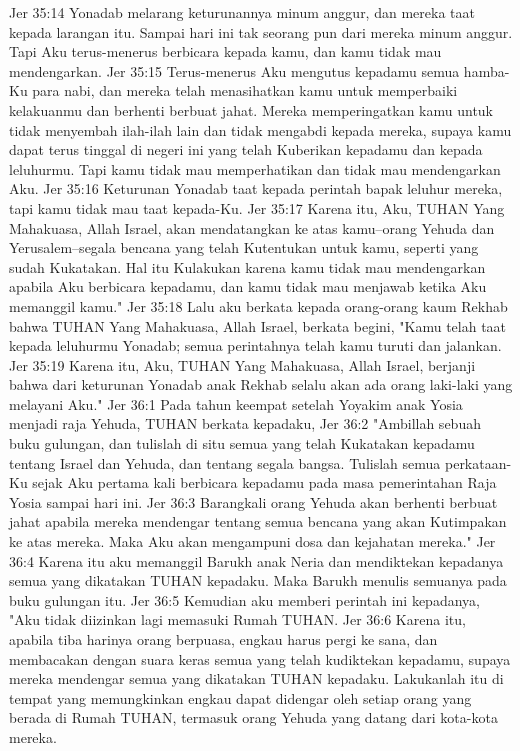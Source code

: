 Jer 35:14  Yonadab melarang keturunannya minum anggur, dan mereka taat kepada larangan itu. Sampai hari ini tak seorang pun dari mereka minum anggur. Tapi Aku terus-menerus berbicara kepada kamu, dan kamu tidak mau mendengarkan.
Jer 35:15  Terus-menerus Aku mengutus kepadamu semua hamba-Ku para nabi, dan mereka telah menasihatkan kamu untuk memperbaiki kelakuanmu dan berhenti berbuat jahat. Mereka memperingatkan kamu untuk tidak menyembah ilah-ilah lain dan tidak mengabdi kepada mereka, supaya kamu dapat terus tinggal di negeri ini yang telah Kuberikan kepadamu dan kepada leluhurmu. Tapi kamu tidak mau memperhatikan dan tidak mau mendengarkan Aku.
Jer 35:16  Keturunan Yonadab taat kepada perintah bapak leluhur mereka, tapi kamu tidak mau taat kepada-Ku.
Jer 35:17  Karena itu, Aku, TUHAN Yang Mahakuasa, Allah Israel, akan mendatangkan ke atas kamu--orang Yehuda dan Yerusalem--segala bencana yang telah Kutentukan untuk kamu, seperti yang sudah Kukatakan. Hal itu Kulakukan karena kamu tidak mau mendengarkan apabila Aku berbicara kepadamu, dan kamu tidak mau menjawab ketika Aku memanggil kamu."
Jer 35:18  Lalu aku berkata kepada orang-orang kaum Rekhab bahwa TUHAN Yang Mahakuasa, Allah Israel, berkata begini, "Kamu telah taat kepada leluhurmu Yonadab; semua perintahnya telah kamu turuti dan jalankan.
Jer 35:19  Karena itu, Aku, TUHAN Yang Mahakuasa, Allah Israel, berjanji bahwa dari keturunan Yonadab anak Rekhab selalu akan ada orang laki-laki yang melayani Aku."
Jer 36:1  Pada tahun keempat setelah Yoyakim anak Yosia menjadi raja Yehuda, TUHAN berkata kepadaku,
Jer 36:2  "Ambillah sebuah buku gulungan, dan tulislah di situ semua yang telah Kukatakan kepadamu tentang Israel dan Yehuda, dan tentang segala bangsa. Tulislah semua perkataan-Ku sejak Aku pertama kali berbicara kepadamu pada masa pemerintahan Raja Yosia sampai hari ini.
Jer 36:3  Barangkali orang Yehuda akan berhenti berbuat jahat apabila mereka mendengar tentang semua bencana yang akan Kutimpakan ke atas mereka. Maka Aku akan mengampuni dosa dan kejahatan mereka."
Jer 36:4  Karena itu aku memanggil Barukh anak Neria dan mendiktekan kepadanya semua yang dikatakan TUHAN kepadaku. Maka Barukh menulis semuanya pada buku gulungan itu.
Jer 36:5  Kemudian aku memberi perintah ini kepadanya, "Aku tidak diizinkan lagi memasuki Rumah TUHAN.
Jer 36:6  Karena itu, apabila tiba harinya orang berpuasa, engkau harus pergi ke sana, dan membacakan dengan suara keras semua yang telah kudiktekan kepadamu, supaya mereka mendengar semua yang dikatakan TUHAN kepadaku. Lakukanlah itu di tempat yang memungkinkan engkau dapat didengar oleh setiap orang yang berada di Rumah TUHAN, termasuk orang Yehuda yang datang dari kota-kota mereka.

